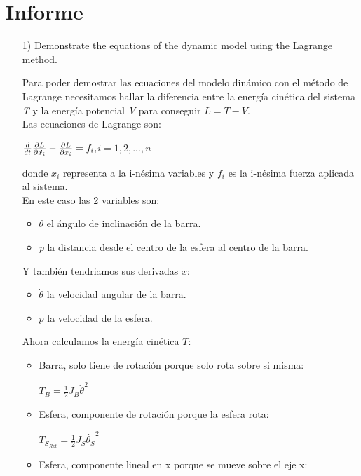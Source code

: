 \documentclass{article}
\begin{document}
\newpage
\section*{Informe}
\begin{itemize}
	\item[1)] Demonstrate the equations of the dynamic model using the Lagrange method.
	
	Para poder demostrar las ecuaciones del modelo dinámico con el método de Lagrange necesitamos hallar la diferencia entre la energía cinética del sistema \textit{T} y la energía potencial \textit{V} para conseguir $L = T - V$.\\
	Las ecuaciones de Lagrange son:
	\begin{center}
		$\frac{d}{dt}\pdv{L}{\dot{x_{i}}}-\pdv{L}{x_{i}}=f_{i},$\hspace{20pt}$i = 1, 2, ..., n$	
	\end{center}
	donde $x_{i}$ representa a la i-nésima variables y $f_{i}$ es la i-nésima fuerza aplicada al sistema.\\
	En este caso las 2 variables son:
	\begin{itemize}
		\item $\theta$ el ángulo de inclinación de la barra.
		\item \textit{p} la distancia desde el centro de la esfera al centro de la barra.
	\end{itemize}
	Y también tendriamos sus derivadas $\dot{x}$:
	\begin{itemize}
		\item $\dot{\theta}$ la velocidad angular de la barra.
		\item $\dot{p}$ la velocidad de la esfera.
	\end{itemize}
	Ahora calculamos la energía cinética $T$:
	\begin{itemize}
		\item Barra, solo tiene de rotación porque solo rota sobre si misma: 
		\begin{center}
			$T_{B} = \frac{1}{2}J_{B}\dot{\theta}^2$
		\end{center}
		\item Esfera, componente de rotación porque la esfera rota:
		\begin{center}
			$T_{S_{Rot}} = \frac{1}{2}J_{S}\dot{\theta_{S}}^2$
		\end{center}
		\item Esfera, componente lineal en x porque se mueve sobre el eje x: 
		\begin{center}

\end{center}
\end{itemize}
\end{itemize}
\end{document}
